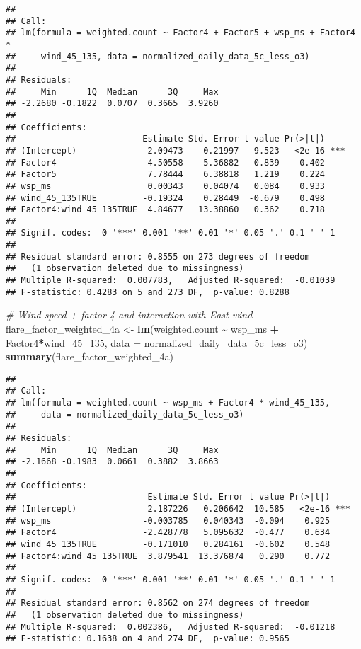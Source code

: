 \documentclass[
]{article}
\newenvironment{Shaded}{\begin{snugshade}}{\end{snugshade}}
\newcommand{\AttributeTok}[1]{\textcolor[rgb]{0.13,0.29,0.53}{#1}}
\newcommand{\CommentTok}[1]{\textcolor[rgb]{0.56,0.35,0.01}{\textit{#1}}}
\newcommand{\FunctionTok}[1]{\textcolor[rgb]{0.13,0.29,0.53}{\textbf{#1}}}
\newcommand{\NormalTok}[1]{#1}
\newcommand{\OtherTok}[1]{\textcolor[rgb]{0.56,0.35,0.01}{#1}}
\newcommand{\SpecialCharTok}[1]{\textcolor[rgb]{0.81,0.36,0.00}{\textbf{#1}}}
\begin{document}
\begin{verbatim}
## 
## Call:
## lm(formula = weighted.count ~ Factor4 + Factor5 + wsp_ms + Factor4 * 
##     wind_45_135, data = normalized_daily_data_5c_less_o3)
## 
## Residuals:
##     Min      1Q  Median      3Q     Max 
## -2.2680 -0.1822  0.0707  0.3665  3.9260 
## 
## Coefficients:
##                         Estimate Std. Error t value Pr(>|t|)    
## (Intercept)              2.09473    0.21997   9.523   <2e-16 ***
## Factor4                 -4.50558    5.36882  -0.839    0.402    
## Factor5                  7.78444    6.38818   1.219    0.224    
## wsp_ms                   0.00343    0.04074   0.084    0.933    
## wind_45_135TRUE         -0.19324    0.28449  -0.679    0.498    
## Factor4:wind_45_135TRUE  4.84677   13.38860   0.362    0.718    
## ---
## Signif. codes:  0 '***' 0.001 '**' 0.01 '*' 0.05 '.' 0.1 ' ' 1
## 
## Residual standard error: 0.8555 on 273 degrees of freedom
##   (1 observation deleted due to missingness)
## Multiple R-squared:  0.007783,   Adjusted R-squared:  -0.01039 
## F-statistic: 0.4283 on 5 and 273 DF,  p-value: 0.8288
\end{verbatim}

\begin{Shaded}
\begin{Highlighting}[]
\CommentTok{\# Wind speed + factor 4 and interaction with East wind}
\NormalTok{flare\_factor\_weighted\_4a }\OtherTok{\textless{}{-}} \FunctionTok{lm}\NormalTok{(weighted.count }\SpecialCharTok{\textasciitilde{}}\NormalTok{ wsp\_ms }\SpecialCharTok{+}\NormalTok{ Factor4}\SpecialCharTok{*}\NormalTok{wind\_45\_135, }
                               \AttributeTok{data =}\NormalTok{ normalized\_daily\_data\_5c\_less\_o3)}
\FunctionTok{summary}\NormalTok{(flare\_factor\_weighted\_4a)}
\end{Highlighting}
\end{Shaded}

\begin{verbatim}
## 
## Call:
## lm(formula = weighted.count ~ wsp_ms + Factor4 * wind_45_135, 
##     data = normalized_daily_data_5c_less_o3)
## 
## Residuals:
##     Min      1Q  Median      3Q     Max 
## -2.1668 -0.1983  0.0661  0.3882  3.8663 
## 
## Coefficients:
##                          Estimate Std. Error t value Pr(>|t|)    
## (Intercept)              2.187226   0.206642  10.585   <2e-16 ***
## wsp_ms                  -0.003785   0.040343  -0.094    0.925    
## Factor4                 -2.428778   5.095632  -0.477    0.634    
## wind_45_135TRUE         -0.171010   0.284161  -0.602    0.548    
## Factor4:wind_45_135TRUE  3.879541  13.376874   0.290    0.772    
## ---
## Signif. codes:  0 '***' 0.001 '**' 0.01 '*' 0.05 '.' 0.1 ' ' 1
## 
## Residual standard error: 0.8562 on 274 degrees of freedom
##   (1 observation deleted due to missingness)
## Multiple R-squared:  0.002386,   Adjusted R-squared:  -0.01218 
## F-statistic: 0.1638 on 4 and 274 DF,  p-value: 0.9565
\end{verbatim}
\end{document}
